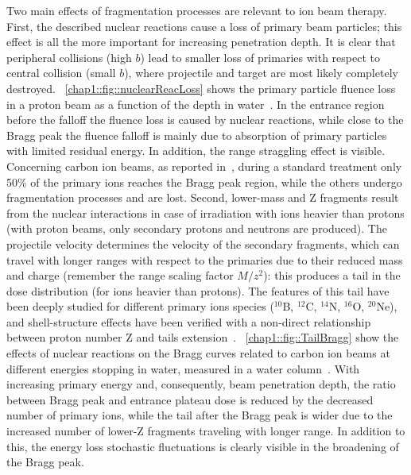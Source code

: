Two main effects of fragmentation processes are relevant to ion beam therapy. 
First, the described nuclear reactions cause a loss of primary beam particles; this effect is all the more important for increasing penetration depth. It is clear that peripheral collisions (high $b$) lead to smaller loss of primaries with respect to central collision (small $b$), where projectile and target are most likely completely destroyed. \figurename~\ref{chap1::fig::nuclearReacLoss} shows the primary particle fluence loss in a proton beam as a function of the depth in water~\parencite{Newhauser2015}. In the entrance region before the falloff the fluence loss is caused by nuclear reactions, while close to the Bragg peak the fluence falloff is mainly due to absorption of primary particles with limited residual energy. In addition, the range straggling effect is visible. Concerning carbon ion beams, as reported in~\cite{Durante2016}, during a standard treatment only 50\% of the primary ions reaches the Bragg peak region, while the others undergo fragmentation processes and are lost.
Second, lower-mass and Z fragments result from the nuclear interactions in case of irradiation with ions heavier than protons (with proton beams, only secondary protons and neutrons are produced).
The projectile velocity determines the velocity of the secondary fragments, which can travel with longer ranges with respect to the primaries due to their reduced mass and charge (remember the range scaling factor $M/z^{2}$): this produces a tail in the dose distribution (for ions heavier than protons). The features of this tail have been deeply studied for different primary ions species ($^{10}$B, $^{12}$C, $^{14}$N, $^{16}$O, $^{20}$Ne), and shell-structure effects have been verified with a non-direct relationship between proton number Z and tails extension~\parencite{Schall1996}.  \figurename~\ref{chap1::fig::TailBragg} show the effects of nuclear reactions on the Bragg curves related to carbon ion beams at different energies stopping in water, measured in a water column~\parencite{Schardt2008}.  With increasing primary energy and, consequently, beam penetration depth, the ratio between Bragg peak and entrance plateau dose is reduced by the decreased number of primary ions, while the tail after the Bragg peak is wider due to the increased number of lower-Z fragments traveling with longer range. In addition to this, the energy loss stochastic fluctuations is clearly visible in the broadening of the Bragg peak.  

